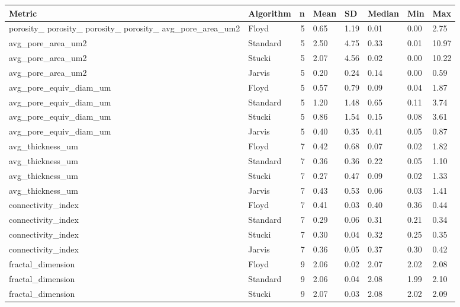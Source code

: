 \begin{tabular}{llrlllll}
\toprule
Metric & Algorithm & n & Mean & SD & Median & Min & Max \\
\midrule
porosity_%
porosity_%
porosity_%
porosity_%
avg_pore_area_um2 & Floyd & 5 & 0.65 & 1.19 & 0.01 & 0.00 & 2.75 \\
avg_pore_area_um2 & Standard & 5 & 2.50 & 4.75 & 0.33 & 0.01 & 10.97 \\
avg_pore_area_um2 & Stucki & 5 & 2.07 & 4.56 & 0.02 & 0.00 & 10.22 \\
avg_pore_area_um2 & Jarvis & 5 & 0.20 & 0.24 & 0.14 & 0.00 & 0.59 \\
avg_pore_equiv_diam_um & Floyd & 5 & 0.57 & 0.79 & 0.09 & 0.04 & 1.87 \\
avg_pore_equiv_diam_um & Standard & 5 & 1.20 & 1.48 & 0.65 & 0.11 & 3.74 \\
avg_pore_equiv_diam_um & Stucki & 5 & 0.86 & 1.54 & 0.15 & 0.08 & 3.61 \\
avg_pore_equiv_diam_um & Jarvis & 5 & 0.40 & 0.35 & 0.41 & 0.05 & 0.87 \\
avg_thickness_um & Floyd & 7 & 0.42 & 0.68 & 0.07 & 0.02 & 1.82 \\
avg_thickness_um & Standard & 7 & 0.36 & 0.36 & 0.22 & 0.05 & 1.10 \\
avg_thickness_um & Stucki & 7 & 0.27 & 0.47 & 0.09 & 0.02 & 1.33 \\
avg_thickness_um & Jarvis & 7 & 0.43 & 0.53 & 0.06 & 0.03 & 1.41 \\
connectivity_index & Floyd & 7 & 0.41 & 0.03 & 0.40 & 0.36 & 0.44 \\
connectivity_index & Standard & 7 & 0.29 & 0.06 & 0.31 & 0.21 & 0.34 \\
connectivity_index & Stucki & 7 & 0.30 & 0.04 & 0.32 & 0.25 & 0.35 \\
connectivity_index & Jarvis & 7 & 0.36 & 0.05 & 0.37 & 0.30 & 0.42 \\
fractal_dimension & Floyd & 9 & 2.06 & 0.02 & 2.07 & 2.02 & 2.08 \\
fractal_dimension & Standard & 9 & 2.06 & 0.04 & 2.08 & 1.99 & 2.10 \\
fractal_dimension & Stucki & 9 & 2.07 & 0.03 & 2.08 & 2.02 & 2.09 \\

\end{tabular}
